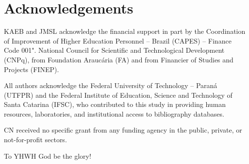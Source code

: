 \section*{Acknowledgements}

    KAEB and JMSL acknowledge the financial support in part by the Coordination  of  Improvement
    of Higher Education Personnel -- Brazil (CAPES) -- Finance Code 001". National  Council  for
    Scientific and Technological Development (CNPq), from Foundation  Araucária  (FA)  and  from
    Financier of Studies and Projects (FINEP).

    All authors acknowledge the Federal University of  Technology  --  Paraná  (UTFPR)  and  the
    Federal Institute of Education,  Science  and  Technology  of  Santa  Catarina  (IFSC),  who
    contributed to this study in providing  human  resources,  laboratories,  and  institutional
    access to bibliography databases.

    CN received  no  specific  grant  from  any  funding  agency  in  the  public,  private,  or
    not-for-profit sectors.

    To YHWH God be the glory!


